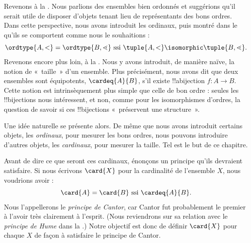 \documentclass[../../../include/open-logic-section]{subfiles}
\begin{document}

Revenons à la . Nous parlions
des ensembles bien ordonnés et suggérions qu'il serait
utile de disposer d'objets tenant lieu de représentants
des bons ordres. Dans cette perspective, nous avons
introduit les ordinaux, puis montré dans le
qu'ils se comportent comme nous le souhaitions :
\[
	\ordtype{A, <} = \ordtype{B, \lessdot}
	\text{ ssi } \tuple{A, <}
	\isomorphic \tuple{B, \lessdot}.
\]
Revenons encore plus loin, à la
. Nous y avons
introduit, de manière naïve, la notion de
«~taille~» d'un ensemble. Plus précisément,
nous avons dit que deux ensembles sont équipotents,
$\cardeq{A}{B}$, s'il existe !!a{bijection}
$f \colon A \to B$. Cette notion est
intrinsèquement {plus simple} que celle de bon
ordre : seules les !!{bijection}s nous intéressent,
et non, comme pour les isomorphismes d'ordres,
la question de savoir si ces !!{bijection}s
«~préservent une structure~».

Une idée naturelle se présente alors. De même
que nous avons introduit certains objets, les
\emph{ordinaux}, pour mesurer les bons ordres,
nous pouvons introduire d'autres objets, les
\emph{cardinaux}, pour mesurer la taille.
Tel est le but de ce chapitre.

Avant de dire ce que seront ces cardinaux,
énonçons un principe qu'ils devraient satisfaire.
Si nous écrivons $\card{X}$ pour la cardinalité
de l'ensemble $X$, nous voudrions avoir :
\[
	\card{A} = \card{B}
	\text{ ssi } \cardeq{A}{B}.
\]
Nous l'appellerons le \emph{principe de Cantor},
car Cantor fut probablement le premier à l'avoir
très clairement à l'esprit. (Nous reviendrons
sur sa relation avec le \emph{principe de Hume}
dans la .) Notre objectif est donc
de définir $\card{X}$ pour chaque $X$ de façon
à satisfaire le principe de Cantor.
\end{document}
